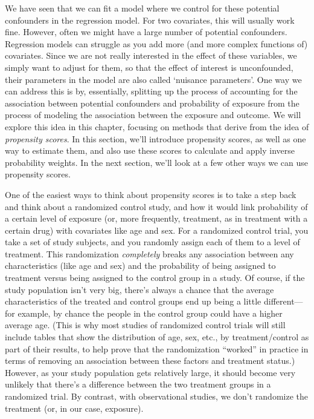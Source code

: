 \documentclass[
]{book}
\begin{document}
We have seen that we can fit a model where we control for these potential confounders in the regression model. For two covariates, this will usually work fine. However, often we might have a large number of potential confounders. Regression models can struggle as you add more (and more complex functions of) covariates. Since we are not really interested in the effect of these variables, we simply want to adjust for them, so that the effect of interest is unconfounded, their parameters in the model are also called `nuisance parameters'. One way we can address this is by, essentially, splitting up the process of accounting for the association between potential confounders and probability of exposure from the process of modeling the association between the exposure and outcome. We will explore this idea in this chapter, focusing on methods that derive from the idea of \emph{propensity scores}. In this section, we'll introduce propensity scores, as well as one way to estimate them, and also use these scores to calculate and apply inverse probability weights. In the next section, we'll look at a few other ways we can use propensity scores.

One of the easiest ways to think about propensity scores is to take a step back and think about a randomized control study, and how it would link probability of a certain level of exposure (or, more frequently, treatment, as in treatment with a certain drug) with covariates like age and sex. For a randomized control trial, you take a set of study subjects, and you randomly assign each of them to a level of treatment. This randomization \emph{completely} breaks any association between any characteristics (like age and sex) and the probability of being assigned to treatment versus being assigned to the control group in a study. Of course, if the study population isn't very big, there's always a chance that the average characteristics of the treated and control groups end up being a little different---for example, by chance the people in the control group could have a higher average age. (This is why most studies of randomized control trials will still include tables that show the distribution of age, sex, etc., by treatment/control as part of their results, to help prove that the randomization ``worked'' in practice in terms of removing an association between these factors and treatment status.) However, as your study population gets relatively large, it should become very unlikely that there's a difference between the two treatment groups in a randomized trial. By contrast, with observational studies, we don't randomize the treatment (or, in our case, exposure).
\end{document}

